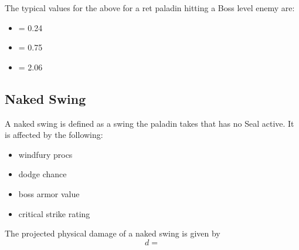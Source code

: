\documentclass[letterpaper,11pt]{article}
\begin{document}
	
	The typical values for the above for a ret paladin hitting a Boss level enemy are:
		\begin{itemize}
			\item \pglance = 0.24
			\item \dglance = 0.75
			\item \dcrit = 2.06
		\end{itemize}


	
	\subsection{Naked Swing}
	A naked swing is defined as a swing the paladin takes that has no Seal active.
	It is affected by the following:
	\begin{itemize}
		\item windfury procs
		\item dodge chance
		\item boss armor value
		\item critical strike rating
	\end{itemize}
	The projected physical damage of a naked swing is given by
	\begin{equation}
		d = 
	\end{equation}
	




	\appendix
	
\end{document}
